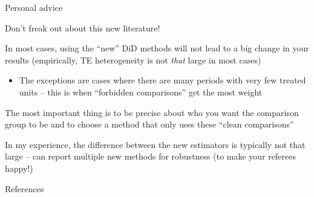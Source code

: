 \documentclass[aspectratio = 169, 13pt]{beamer}
\begin{document}
\begin{frame}{Personal advice}
  \begin{wideitemize}
    \item
    Don't freak out about this new literature!

    \pause
    \item
    In most cases, using the ``new'' DiD methods will not lead to a big change in your results (empirically, TE heterogeneity is not \textit{that} large in most cases)
    \begin{itemize}
      \item
            The exceptions are cases where there are many periods with very few treated units -- this is when ``forbidden comparisons'' get the most weight
    \end{itemize}

    \pause
    \item
    The most important thing is to be precise about who you want the comparison group to be and to choose a method that only uses these ``clean comparisons''

    \pause
    \item
    In my experience, the difference between the new estimators is typically not that large -- can report multiple new methods for robustness (to make your referees happy!)
  \end{wideitemize}
\end{frame}


\backupbegin
\begin{frame}{References}
  
\end{frame}
\backupend
\end{document}
